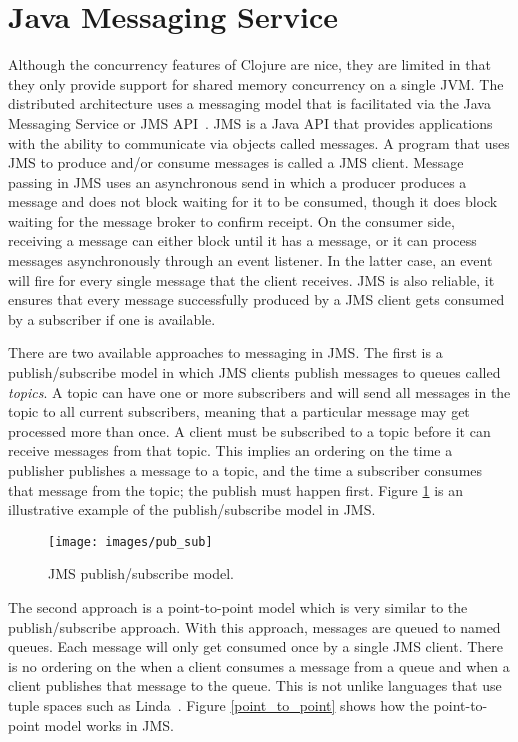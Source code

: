 \section{Java Messaging Service}
Although the concurrency features of Clojure are nice, they are limited in that they only provide support for shared memory concurrency on a single JVM. 
The distributed architecture uses a messaging model that is facilitated via the Java Messaging Service or JMS API~\cite{jms, jms1}.
JMS is a Java API that provides applications with the ability to communicate via objects called messages.
A program that uses JMS to produce and/or consume messages is called a JMS client.
Message passing in JMS uses an asynchronous send in which a producer produces a message and does not block waiting for it to be consumed, though it does block waiting for the message broker to confirm receipt.
On the consumer side, receiving a message can either block until it has a message, or it can process messages asynchronously through an event listener.
In the latter case, an event will fire for every single message that the client receives.
JMS is also reliable, it ensures that every message successfully produced by a JMS client gets consumed by a subscriber if one is available.

There are two available approaches to messaging in JMS.
The first is a publish/subscribe model in which JMS clients publish messages to queues called {\it topics}.
A topic can have one or more subscribers and will send all messages in the topic to all current subscribers, meaning that a particular message may get processed more than once.
A client must be subscribed to a topic before it can receive messages from that topic.
This implies an ordering on the time a publisher publishes a message to a topic, and the time a subscriber consumes that message from the topic; the publish must happen first.
Figure \ref{pub_sub} is an illustrative example of the publish/subscribe model in JMS.

\begin{figure}[htb!]
  \centering
  \texttt{[image: images/pub\_sub]}
  \caption{JMS publish/subscribe model.}
  \label{pub_sub}
\end{figure}

The second approach is a point-to-point model which is very similar to the publish/subscribe approach.
With this approach, messages are queued to named queues.
Each message will only get consumed once by a single JMS client.
There is no ordering on the when a client consumes a message from a
queue and when a client publishes that message to the queue.
This is not unlike languages that use tuple spaces such as Linda~\cite{linda}.
Figure \ref{point_to_point} shows how the point-to-point model works in JMS.

